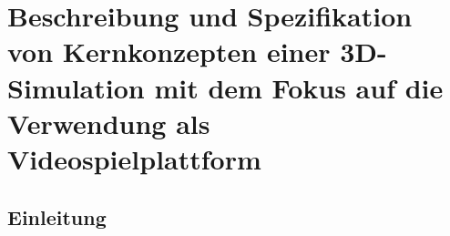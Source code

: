\section{Beschreibung und Spezifikation von Kernkonzepten einer 3D-Simulation mit dem Fokus auf die Verwendung als Videospielplattform}
\label{appendixA}
\subsection{Einleitung}



